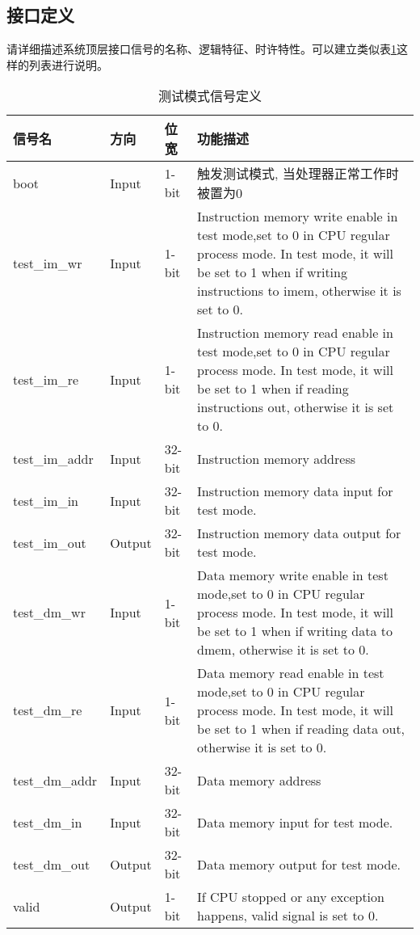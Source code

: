 \documentclass[UTF8]{article}
\begin{document}
\subsection{接口定义}\label{sub:Interface}
请详细描述系统顶层接口信号的名称、逻辑特征、时许特性。可以建立类似表\ref{tab:signaldef}这样的列表进行说明。

\begin{table}[htp]
\caption{测试模式信号定义}\label{tab:signaldef}
\begin{center}
	\begin{tabular}{|l|l|l|p{6cm}|}
	\hline
	\textbf{信号名} & \textbf{方向} & \textbf{位宽} & \textbf{功能描述}\\ \hline \hline
	boot			& Input 	& 1-bit	& 触发测试模式, 当处理器正常工作时被置为0\\ \hline
	test\_im\_wr 	& Input	& 1-bit	& Instruction memory write enable in test mode,set to 0 in 	
								  CPU regular process mode. In test mode, it will be set to 1 when if writing instructions to imem, otherwise it is set to 0.\\ \hline
	test\_im\_re 	& Input & 1-bit & Instruction memory read enable in test mode,set to 0 in 	
								  CPU regular process mode. In test mode, it will be set to 1 when if reading instructions out, otherwise it is set to 0. \\ \hline
	test\_im\_addr 	& Input & 32-bit& Instruction memory address\\ \hline
	test\_im\_in 	& Input & 32-bit& Instruction memory data input for test mode. \\ \hline
	test\_im\_out 	& Output& 32-bit& Instruction memory data output for test mode. \\ \hline
	test\_dm\_wr 	& Input	& 1-bit	& Data memory write enable in test mode,set to 0 in 	
								  CPU regular process mode. In test mode, it will be set to 1 when if writing data to dmem, otherwise it is set to 0.\\ \hline
	test\_dm\_re 	& Input & 1-bit & Data memory read enable in test mode,set to 0 in 	
								  CPU regular process mode. In test mode, it will be set to 1 when if reading data out, otherwise it is set to 0.\\ \hline
	test\_dm\_addr 	& Input & 32-bit& Data memory address\\ \hline
	test\_dm\_in 	& Input & 32-bit& Data memory input for test mode. \\ \hline
	test\_dm\_out 	& Output& 32-bit& Data memory output for test mode. \\ \hline
	valid			& Output& 1-bit & If CPU stopped or any exception happens, valid signal is set to 0.\\ 
	\hline
	\end{tabular}
\end{center}
\end{table}
\end{document}
